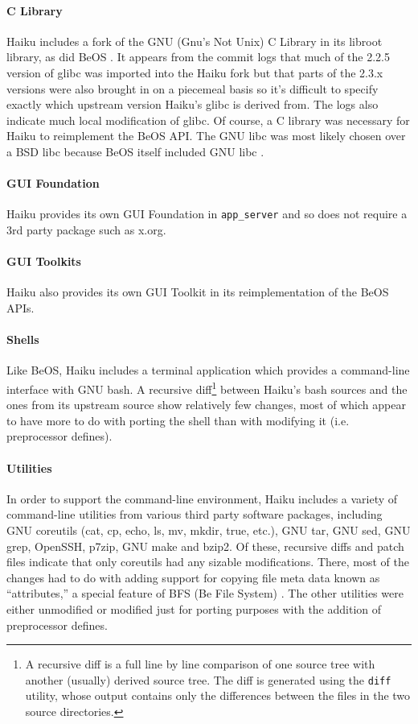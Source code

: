 \documentclass{article}
\begin{document}
\paragraph{C Library}
Haiku includes a fork of the GNU (Gnu's Not Unix) C Library in its
libroot library, as did BeOS \cite{GlibCWiki}.  It appears from the
commit logs that much of the 2.2.5 version of glibc was imported into
the Haiku fork
\cite{HaikuLibrootGlibcOld} but that parts of the 2.3.x versions were
also brought in on a piecemeal basis \cite{HaikuLibrootGlibcRecent} so
it's difficult to specify exactly which upstream version Haiku's glibc
is derived from.  The logs also indicate much local modification of
glibc.  Of course, a C library was necessary for Haiku to reimplement
the BeOS API.  The GNU libc was most likely chosen over a BSD libc
because BeOS itself included GNU libc \cite{GlibCWiki}.

\paragraph{GUI Foundation}
Haiku provides its own GUI Foundation in \texttt{app\_server} and so
does not require a 3rd party package such as x.org.

\paragraph{GUI Toolkits}
Haiku also provides its own GUI Toolkit in its reimplementation of the
BeOS APIs.

\paragraph{Shells}
Like BeOS, Haiku includes a terminal application which provides a
command-line interface with GNU bash.  A recursive diff\footnote{A
recursive diff is a full line by line comparison of one source tree
with another (usually) derived source tree.  The diff is generated
using the \texttt{diff} utility, whose output contains only the
differences between the files in the two source directories.} between
Haiku's bash sources and the ones from its upstream source show
relatively few changes, most of which appear to have more to do with
porting the shell than with modifying it (i.e. preprocessor defines).

\paragraph{Utilities}
In order to support the command-line environment, Haiku includes a
variety of command-line utilities from various third party software
packages, including GNU coreutils (cat, cp, echo, ls, mv, mkdir, true,
etc.), GNU tar, GNU sed, GNU grep, OpenSSH, p7zip, GNU make and bzip2.
Of these, recursive diffs and patch files \cite{HaikuR1A3Src} indicate
that only coreutils had any sizable modifications.  There, most of the
changes had to do with adding support for copying file meta data known
as ``attributes,'' a special feature of BFS (Be File System)
\cite{BFSWiki}.  The other utilities were either unmodified or
modified just for porting purposes with the addition of preprocessor
defines.
\end{document}
